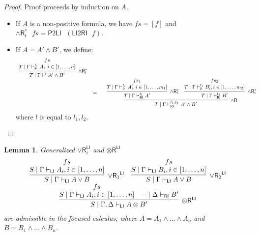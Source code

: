 \documentclass[submission,copyright,creativecommons]{eptcs}
\newtheorem{lemma}[theorem]{Lemma}
\theoremstyle{definition}
\newcommand{\tr}{\otimes \mathsf{R}}
\newcommand{\andr}{\land \mathsf{R}}
\newcommand{\orrone}{\lor \mathsf{R_{1}}}
\newcommand{\orrtwo}{\lor \mathsf{R_{2}}}
\newcommand{\orri}{\lor \mathsf{R}_{i}}
\newcommand{\ot}{\otimes}
\newcommand{\RI}{\mathsf{RI}}
\newcommand{\LI}{\mathsf{LI}}
\newcommand{\Pass}{\mathsf{P}}
\newcommand{\proofbox}[1]{\begin{tabular}{l} #1 \end{tabular}}
\begin{document}
\begin{proof}
  Proof proceeds by induction on $A$.
  \begin{itemize}
    \item If $A$ is a non-positive formula, we have $fs = [ f ]$ and $\andr^*_{t} \text{ } fs = \Pass 2 \LI \text{ } (\LI 2 \RI \text{ } f)$.
    \item If $A = A' \land B'$, we define:
    \begin{displaymath}
      \small
      \begin{array}{cc}
        \infer[\andr^*_{t}]{T \mid \Gamma \vdash^{l} A' \land B'}{
          \deduce{T \mid \Gamma \vdash^{t_i}_{\Pass} A_i , i \in [1 , \dots , n]}{fs}
        }
        \\
        &
        =
        \quad
        \proofbox{
        \infer[\andr]{T \mid \Gamma \vdash^{l_1 , l_2}_{\RI} A' \land B'}{
          \infer[\andr^{*}_{t}]{T \mid \Gamma \vdash^{l_1}_{\RI} A'}{
            \deduce{T \mid \Gamma \vdash^{t_i}_{\Pass} A'_i , i \in [1 , \dots , m_1]}{fs_1}
          }
          &
          \infer[\andr^{*}_{t}]{T \mid \Gamma \vdash^{l_2}_{\RI} B'}{
            \deduce{T \mid \Gamma \vdash^{t_i}_{\Pass} B'_i , i \in [1 , \dots , m_2]}{fs_2}
          }
        }
       }
      \end{array}
    \end{displaymath}
    where $l$ is equal to $l_1 , l_2$.
  \end{itemize}
\end{proof}
\begin{lemma}
  Generalized $\orri^{\LI}$ and $\tr^{\LI}$
  \begin{displaymath}
    \begin{array}{c}
      \infer[\orrone^{\LI}]{S \mid \Gamma \vdash_{\LI} A \lor B}{
        \deduce{S \mid \Gamma \vdash_{\LI} A_i, i \in [1 , \dots , n]}{fs}
      }
      \quad
      \infer[\orrtwo^{\LI}]{S \mid \Gamma \vdash_{\LI} A \lor B}{
        \deduce{S \mid \Gamma \vdash_{\LI} B_i, i \in [1 , \dots , n]}{fs}
      }
      \\
      \infer[\tr^{\LI}]{S \mid \Gamma , \Delta \vdash_{\LI} A \ot B'}{
        \deduce{S \mid \Gamma \vdash_{\LI} A_i , i \in [1 , \dots , n]}{fs}
        &
        - \mid \Delta \vdash_{\RI} B'
      }
    \end{array}
  \end{displaymath}
  are admissible in the focused calculus, where $A = A_1 \land \dots \land A_n$ and $B = B_1 \land \dots \land B_n$.
\end{lemma}
\end{document}
